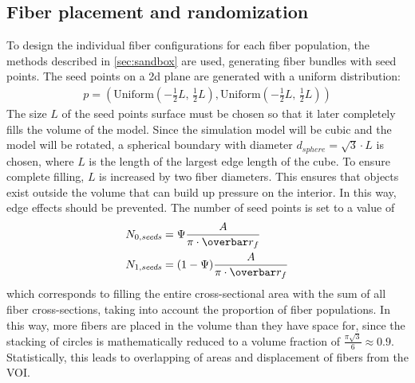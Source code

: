 \subsection{Fiber placement and randomization}
%
To design the individual fiber configurations for each fiber population, the methods described in \cref{sec:sandbox} are used, \ie{} generating fiber bundles with seed points.
The seed points on a 2d plane are generated with a uniform distribution:
\begin{align}
p = (\mathrm{Uniform}(-\frac{1}{2}\mathit{L}, \, \frac{1}{2}\mathit{L}), \mathrm{Uniform}(-\frac{1}{2}\mathit{L}, \, \frac{1}{2}\mathit{L}))
\end{align}
The size $\mathit{L}$ of the seed points surface must be chosen so that it later completely fills the volume of the model.
Since the simulation model will be cubic and the model will be rotated, a spherical boundary with diameter $d_{\mathit{sphere}}=\sqrt{3} \cdot \mathit{L}$ is chosen, where $\mathit{L}$ is the length of the largest edge length of the cube.
To ensure complete filling, $\mathit{L}$ is increased by two fiber diameters.
This ensures that objects exist outside the volume that can build up pressure on the interior.
In this way, edge effects should be prevented.
The number of seed points is set to a value of
\begin{align}
N_{0,\mathit{seeds}} &= \modelPsi \frac{A}{\pi \cdot \fiberRadiusMean}\\
N_{1,\mathit{seeds}} &= (1-\modelPsi) \frac{A}{\pi \cdot \fiberRadiusMean}
\end{align}
which corresponds to filling the entire cross-sectional area with the sum of all fiber cross-sections, taking into account the proportion of fiber populations.
In this way, more fibers are placed in the volume than they have space for, since the stacking of circles is mathematically reduced to a volume fraction of $\frac{\pi \sqrt{3}}{6} \approx 0.9$.
Statistically, this leads to overlapping of areas and displacement of fibers from the \ac{VOI}.
\par
%
